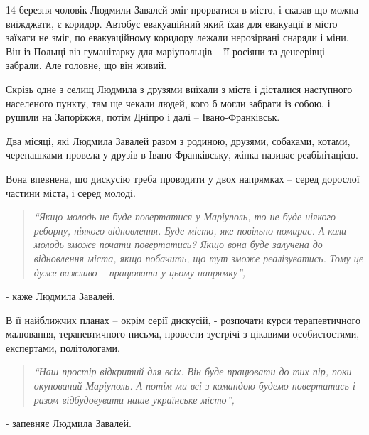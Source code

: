 
14 березня чоловік Людмили Завалєй зміг прорватися в місто, і сказав що можна
виїжджати, є коридор.  Автобус евакуаційний який їхав для евакуації в місто
заїхати не зміг, по евакуаційному коридору лежали нерозірвані снаряди і міни.
Він із Польщі віз гуманітарку для маріупольців  – її росіяни та денеерівці
забрали. Але головне, що він живий.


Скрізь одне з селищ Людмила з друзями виїхали з міста і дісталися наступного
населеного пункту, там ще чекали людей, кого б могли забрати із собою, і рушили
на Запоріжжя, потім Дніпро і далі – Івано-Франківськ. 

Два місяці, які Людмила Завалей разом з родиною, друзями, собаками, котами,
черепашками провела у друзів в Івано-Франківську, жінка називає реабілітацією.


Вона впевнена, що дискусію треба проводити у двох напрямках – серед дорослої
частини міста, і серед молоді.

\begin{quote}
\em\enquote{Якщо молодь не буде повертатися у Маріуполь, то не буде ніякого реборну,
ніякого відновлення. Буде місто, яке повільно помирає. А коли молодь зможе
почати повертатись? Якщо вона буде залучена до відновлення міста, якщо
побачить, що тут зможе реалізуватись. Тому це дуже важливо – працювати у цьому
напрямку}, 
\end{quote}
- каже Людмила Завалей.


В її найближчих планах – окрім серії дискусій,  - розпочати курси
терапевтичного малювання, терапевтичного письма, провести зустрічі з цікавими
особистостями, експертами, політологами.

\begin{quote}
\em\enquote{Наш простір відкритий для всіх. Він буде працювати до тих пір, поки окупований
Маріуполь. А потім ми всі з командою будемо повертатись і разом відбудовувати
наше українське місто}, 
\end{quote}
- запевняє Людмила Завалей.

